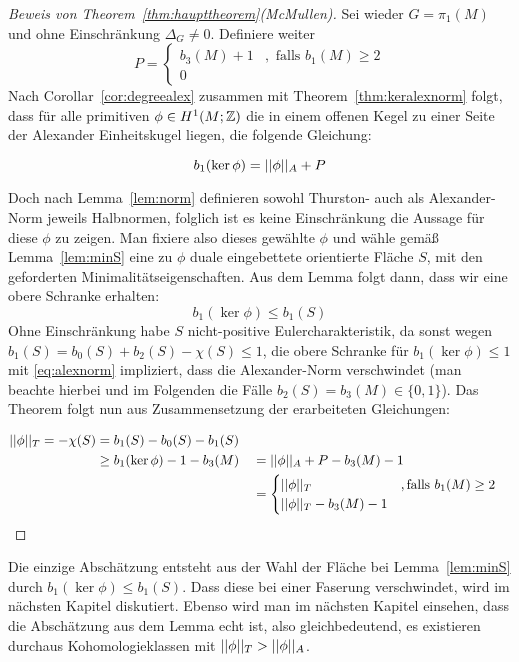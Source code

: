 \begin{proof}[Beweis von Theorem~\ref{thm:haupttheorem}(McMullen)]
	Sei wieder $G=\pi_1(M)$ und ohne Einschränkung $\Delta_G\neq 0$. Definiere weiter \[
	P=\begin{cases}
		b_3(M)+1 &, \text{ falls } b_1(M) \geq 2	\\
		0
	\end{cases}
	\]	
	Nach Corollar~\ref{cor:degreealex} zusammen mit Theorem~\ref{thm:keralexnorm} folgt, dass für alle primitiven $\phi \in H^1(M;\mathbb{Z})$ die in einem offenen Kegel zu einer Seite der Alexander Einheitskugel liegen, die folgende Gleichung:
	
		\begin{equation}
		b_1(\ker\phi)= ||\phi||_A + P \label{eq:alexnorm}
		\end{equation}
	
	Doch nach Lemma~\ref{lem:norm} definieren sowohl Thurston- auch als Alexander-Norm jeweils Halbnormen, folglich ist es keine Einschränkung die Aussage für diese $\phi$ zu zeigen. Man fixiere also dieses gewählte $\phi$ und wähle gemäß Lemma~\ref{lem:minS} eine zu $\phi$ duale eingebettete orientierte Fläche $S$, mit den geforderten Minimalitätseigenschaften. Aus dem Lemma folgt dann, dass wir eine obere Schranke erhalten:
	\begin{equation}
		b_1(\ker\phi) \leq b_1(S) \label{eq:obereSchrankeS}
	\end{equation}
	Ohne Einschränkung habe $S$ nicht-positive Eulercharakteristik, da sonst wegen $b_1(S)= b_0(S) + b_2(S) - \chi(S) \leq 1$, die obere Schranke für $b_1(\ker\phi)\leq 1$  mit \eqref{eq:alexnorm} impliziert, dass die Alexander-Norm verschwindet (man beachte hierbei und im Folgenden die Fälle $b_2(S)=b_3(M) \in \{0,1\}$). Das Theorem folgt nun aus Zusammensetzung der erarbeiteten Gleichungen:
	
		\begin{align*}
		||\phi||_T = -\chi(S) &= b_1(S)-b_0(S)-b_1(S)\\
					&\geq b_1(\ker\phi) -1-b_3(M) &&= ||\phi||_A +P -b_3(M)-1\\
					&&& = \begin{cases}
						||\phi||_T &, \text{falls } b_1(M)\geq 2\\
						||\phi||_T -b_3(M)-1
					\end{cases}
		\end{align*}
\end{proof} 
	Die einzige Abschätzung entsteht aus der Wahl der Fläche bei Lemma~\ref{lem:minS} durch $b_1(\ker\phi)\leq b_1(S)$. Dass diese bei einer Faserung verschwindet, wird im nächsten Kapitel diskutiert. Ebenso wird man im nächsten Kapitel einsehen, dass die Abschätzung aus dem Lemma echt ist, also gleichbedeutend, es existieren durchaus Kohomologieklassen mit $||\phi||_T > ||\phi||_A$.